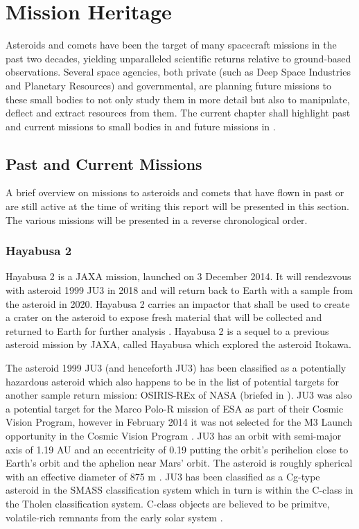 \chapter{Mission Heritage}
\label{heritage}
\graphicspath{{chapter-1/Images/}}

Asteroids and comets have been the target of many spacecraft missions in the past two decades, yielding unparalleled scientific returns relative to ground-based observations. Several space agencies, both private (such as Deep Space Industries and Planetary Resources) and governmental, are planning future missions to these small bodies to not only study them in more detail but also to manipulate, deflect and extract resources from them. The current chapter shall highlight past and current missions to small bodies in  and future missions in .

\section{Past and Current Missions}
\label{past_current}
A brief overview on missions to asteroids and comets that have flown in past or are still active at the time of writing this report will be presented in this section. The various missions will be presented in a reverse chronological order.

\subsection{Hayabusa 2}
\label{hayabusa2}
Hayabusa 2 is a \gls{JAXA} mission, launched on 3 December 2014. It will rendezvous with asteroid 1999 JU3 in 2018 and will return back to Earth with a sample from the asteroid in 2020. Hayabusa 2 carries an impactor that shall be used to create a crater on the asteroid to expose fresh material that will be collected and returned to Earth for further analysis \cite{hayabusa2}. Hayabusa 2 is a sequel to a previous asteroid mission by \gls{JAXA}, called Hayabusa which explored the asteroid Itokawa.

The asteroid 1999 JU3 (and henceforth JU3) has been classified as a potentially hazardous asteroid which also happens to be in the list of potential targets for another sample return mission: OSIRIS-REx of \gls{NASA} (briefed in ). JU3 was also a potential target for the Marco Polo-R mission of \gls{ESA} as part of their Cosmic Vision Program, however in February 2014 it was not selected for the M3 Launch opportunity in the Cosmic Vision Program \cite{marcopolor}. JU3 has an orbit with semi-major axis of 1.19 \gls{AU} and an eccentricity of 0.19 putting the orbit's perihelion close to Earth's orbit and the aphelion near Mars' orbit. The asteroid is roughly spherical with an effective diameter of 875 m \cite{hayabusa2}. JU3 has been classified as a Cg-type asteroid in the \gls{SMASS} classification system which in turn is within the C-class in the Tholen classification system. C-class objects are believed to be primitve, volatile-rich remnants from the early solar system \cite{ju3originspaper}.

